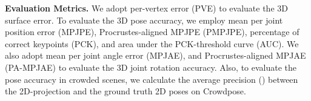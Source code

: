 \documentclass[10pt,twocolumn,letterpaper]{article}
\begin{document}
\textbf{Evaluation Metrics.}
We adopt per-vertex error (PVE) to evaluate the 3D surface error.
To evaluate the 3D pose accuracy, we employ mean per joint position error (MPJPE), Procrustes-aligned MPJPE (PMPJPE), percentage of correct keypoints (PCK), and area under the PCK-threshold curve (AUC).
We also adopt mean per joint angle error (MPJAE), and Procrustes-aligned MPJAE (PA-MPJAE) to evaluate the 3D joint rotation accuracy. 
Also, to evaluate the pose accuracy in crowded scenes, we calculate the average precision () between the 2D-projection  and the ground truth 2D poses on Crowdpose.

\begin{table}
    \caption{ {Comparisons to the state-of-the-art methods on 3DPW following \textit{Protocol 3} (fine-tuned on the training set).  means using extra datasets (compared with EFT) for training.}}\label{tab:3DPW_VIBE3}
\end{table}
\end{document}
